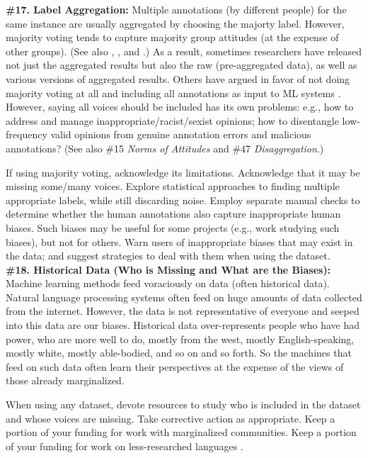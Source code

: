 \documentclass{clv3}
\begin{document}
\noindent \textbf{\#17. Label Aggregation:} Multiple annotations (by different people) for the same instance  are usually aggregated 
by choosing the majorty label. However, majority voting tends to capture majority group attitudes (at the expense of other groups). (See also \citet{aroyo2015truth}, \citet{checco2017let}, and \citet{klenner2020harmonization}.) As a result, sometimes researchers have released not just the aggregated results but also the raw (pre-aggregated data), as well as various versions of aggregated results. Others have argued in favor of not doing majority voting at all and including all annotations as input to ML systems \cite{basile2020s}. However, saying all voices should be included has its own problems: e.g., how to address and manage inappropriate/racist/sexist opinions; how to disentangle low-frequency valid opinions from genuine annotation errors and malicious annotations? (See also \#15 \textit{Norms of Attitudes} and \#47 \textit{Disaggregation}.)

If using majority voting, acknowledge its limitations. Acknowledge that it may be missing some/many voices.
Explore statistical approaches to finding multiple appropriate labels, while still discarding noise.
Employ separate manual checks to determine whether the human annotations also capture inappropriate human biases. Such biases may be useful for some projects (e.g., work studying such biases), but not for others. Warn users of  inappropriate biases that may exist in the data; and suggest strategies to deal with them when using the dataset.\\

\noindent \textbf{\#18. Historical Data (Who is Missing and What are the Biases):} Machine learning methods feed voraciously on data (often historical data). Natural language processing systems often feed on huge amounts of data collected from the internet. However, the data is not representative of everyone and seeped into this data are our biases.
Historical data over-represents people who have had power, who are more well to do, mostly from the west, mostly English-speaking, mostly white, mostly able-bodied, and so on and so forth. So the machines that feed on such data often learn their perspectives at the expense of the views of those already marginalized.

When using any dataset, devote resources to study who is included in the dataset and whose voices are missing. Take corrective action as appropriate.
Keep a portion of your funding for work with marginalized communities. Keep a portion of your funding for work on less-researched languages \cite{ruder_2020}.\\
\end{document}

